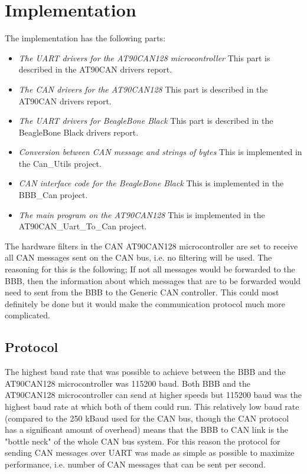 
\section{Implementation}\label{sec:implementation}
The implementation has the following parts:

\begin{itemize}
   \item { \em The UART drivers for the AT90CAN128 microcontroller} \newline This part is described in the AT90CAN drivers report.
   \item { \em The CAN drivers for the AT90CAN128} \newline This part is described in the AT90CAN drivers report.
   \item { \em The UART drivers for BeagleBone Black} \newline This part is described in the BeagleBone Black drivers report.
   \item { \em Conversion between CAN message and strings of bytes } \newline This is implemented in the Can\_Utils project.
   \item { \em CAN interface code for the BeagleBone Black} \newline This is implemented in the BBB\_Can project.
   \item { \em The main program on the AT90CAN128} \newline This is implemented in the AT90CAN\_Uart\_To\_Can project.
\end{itemize}

The hardware filters in the CAN AT90CAN128 microcontroller are set to receive all CAN messages sent on the CAN bus, i.e. no filtering will be used. The reasoning for this is the following; 
If not all messages would be forwarded to the BBB, then the information about which messages that are to be forwarded would need to sent from the BBB to the Generic CAN controller. This could most definitely be done but it would make the communication protocol much more complicated.

\subsection{Protocol}
The highest baud rate that was possible to achieve between the BBB and the AT90CAN128 microcontroller was 115200 baud. Both BBB and the AT90CAN128 microcontroller can send at higher speeds but 115200 baud was the highest baud rate at which both of them could run. This relatively low baud rate (compared to the 250 kBaud used for the CAN bus, though the CAN protocol has a significant amount of overhead) means that the BBB to CAN link is the "bottle neck" of the whole CAN bus system. For this reason the protocol for sending CAN messages over UART was made as simple as possible to maximize performance, i.e. number of CAN messages that can be sent per second.

